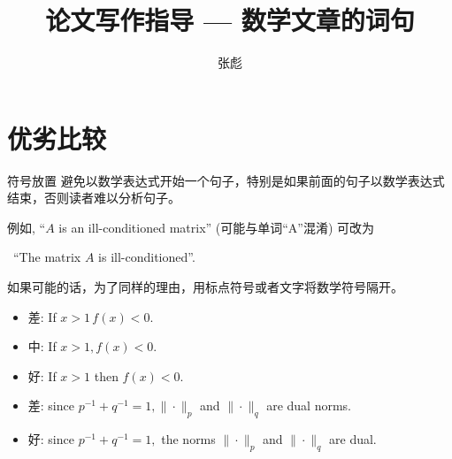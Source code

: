 \documentclass{ctexbeamer}
\begin{document}
\title[]{论文写作指导 --- 数学文章的词句}
\author[]{{\large 张彪} }

\date{}






\begin{frame}
\maketitle
\end{frame}




\section{优劣比较}

\begin{frame}{符号放置}
	避免以数学表达式开始一个句子，特别是如果前面的句子以数学表达式结束，否则读者难以分析句子。
	
	例如, ``$A$ is  an ill-conditioned matrix'' 
	(可能与单词``A''混淆)	
	可改为\pause
	
	 \qquad 	 \ ``The matrix $A$ is   ill-conditioned''. 
\vspace{10pt}

如果可能的话，为了同样的理由，用标点符号或者文字将数学符号隔开。

	\begin{itemize}
\item 差: If $x>1 \, f(x)<0$.\pause

\item 中: If $x>1, f(x)<0$. \pause

\item  好: If $x>1$ then $f(x)<0$.
	\end{itemize}

\vspace{10pt}

	\begin{itemize}
	\item 
差: since $p^{-1}+q^{-1}=1,\|\cdot\|_{p}$ and $\|\cdot\|_{q}$ are dual norms. \pause

\item  好: since $p^{-1}+q^{-1}=1,$ the norms $\|\cdot\|_{p}$ and $\|\cdot\|_{q}$ are dual.
	\end{itemize}
\vspace{10pt}
\end{frame}
\end{document}

